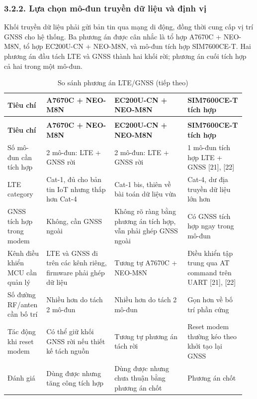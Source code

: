\documentclass[a4paper]{extarticle}
\newcommand{\thesissettableid}[2]{%
  \renewcommand{\thetable}{#1}%
  \renewcommand{\theHtable}{#2}%
}
\begin{document}
\subsubsection{3.2.2. Lựa chọn mô-đun truyền dữ liệu và định vị}\label{lux1ef1a-chux1ecdn-muxf4-ux111un-truyux1ec1n-dux1eef-liux1ec7u-vuxe0-ux111ux1ecbnh-vux1ecb}

Khối truyền dữ liệu phải gửi bản tin qua mạng di động, đồng thời cung cấp vị trí GNSS cho hệ thống. Ba phương án được cân nhắc là tổ hợp A7670C + NEO-M8N, tổ hợp EC200U-CN + NEO-M8N, và mô-đun tích hợp SIM7600CE-T. Hai phương án đầu tách LTE và GNSS thành hai khối rời; phương án cuối tích hợp cả hai trong một mô-đun.

{\thesissettableid{3.5}{condensed-bang-3-5-so-sanh-phuong-an-lte-gnss}
\def\LTcaptype{table}
\begin{longtable}{|L{0.146\linewidth}|L{0.277\linewidth}|L{0.293\linewidth}|L{0.235\linewidth}|}
\caption{So sánh phương án LTE/GNSS}\label{tab:condensed-bang-3-5-so-sanh-phuong-an-lte-gnss}\\
\hline
\textbf{Tiêu chí} & \textbf{A7670C + NEO-M8N} & \textbf{EC200U-CN + NEO-M8N} & \textbf{SIM7600CE-T tích hợp} \\
\hline
\endfirsthead
\caption[]{So sánh phương án LTE/GNSS (tiếp theo)}\\
\hline
\textbf{Tiêu chí} & \textbf{A7670C + NEO-M8N} & \textbf{EC200U-CN + NEO-M8N} & \textbf{SIM7600CE-T tích hợp} \\
\hline
\endhead
\endfoot
\endlastfoot
Số mô-đun cần tích hợp & 2 mô-đun: LTE + GNSS rời & 2 mô-đun: LTE + GNSS rời & 1 mô-đun tích hợp LTE + GNSS {[}21{]}, {[}22{]} \\\hline
LTE category & Cat-1, đủ cho bản tin IoT nhưng thấp hơn Cat-4 & Cat-1 bis, thiên về bài toán dữ liệu vừa & Cat-4, dư địa truyền dữ liệu lớn hơn \\\hline
GNSS tích hợp trong modem & Không, cần GNSS ngoài & Không rõ ràng bằng phương án tích hợp, vẫn phải ghép GNSS ngoài & Có GNSS tích hợp ngay trong mô-đun \\\hline
Kênh điều khiển MCU cần quản lý & LTE và GNSS đi trên các kênh riêng, firmware phải ghép dữ liệu & Tương tự A7670C + NEO-M8N & Điều khiển tập trung qua AT command trên UART {[}21{]}, {[}22{]} \\\hline
Số đường RF/anten cần bố trí & Nhiều hơn do tách 2 mô-đun & Nhiều hơn do tách 2 mô-đun & Gọn hơn về bố trí phần cứng \\\hline
Tác động khi reset modem & Có thể giữ khối GNSS rời nếu thiết kế tách nguồn & Tương tự phương án tách rời & Reset modem thường kéo theo khởi tạo lại GNSS \\\hline
Đánh giá & Dùng được nhưng tăng công tích hợp & Dùng được nhưng chưa thuận bằng phương án chốt & Phương án chốt \\\hline
\end{longtable}
}
\end{document}
